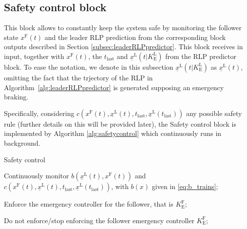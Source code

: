 \documentclass[letterpaper, 10 pt, conference]{ieeeconf}
\theoremstyle{definition}
\theoremstyle{nopoint}
\newcommand{\tildeAdd}{~}
\begin{document}
 
\subsection{Safety control block}
 \label{subsec:safetycontrolblock} 

This block allows to constantly keep the system safe by monitoring the follower state $x^\mathrm{F}(t)$ and the leader RLP prediction from the corresponding block outputs described in Section \ref{subsec:leaderRLPpredictor}. This block receives in input, together with $x^\mathrm{F} (t)$, the $t_\mathrm{last}$ and $\underline{x}^\mathrm{L}(t| K_\mathrm{E}^\mathrm{L})$ from the RLP predictor block. To ease the notation, we denote in this subsection $\underline{x}^\mathrm{L}(t| K_\mathrm{E}^\mathrm{L})$ as $ \underline{x}^\mathrm{L}(t)$, omitting the fact that the trjectory of the RLP in Algorithm\tildeAdd\ref{alg:leaderRLPpredictor} is generated supposing an emergency braking.


Specifically, considering $c(x^\mathrm{F}(t),\underline{x}^\mathrm{L}(t),t_{\mathrm{last}},\underline{x}^\mathrm{L}(t_{\mathrm{last}}))$ any possible safety rule (further details on this will be provided later), the Safety control block is implemented by Algorithm \ref{alg:safetycontrol} which continuously runs in background.

\begin{algorithm}
\caption{Safety control}\label{alg:safetycontrol}
\begin{algorithmic}[1]
\Loop

\State Continuously monitor $b({\underline{x}^\mathrm{L}} (t),{x^\mathrm{F}}(t))$ and $c(x^\mathrm{F}(t),\underline{x}^\mathrm{L}(t),t_{\mathrm{last}},\underline{x}^\mathrm{L}(t_{\mathrm{last}}))$, with $b(x)$ given in \eqref{eq:b_trains};

 
\State Enforce the emergency controller for the follower, that is $K_\mathrm{E}^\mathrm{F}$;

\Else  

Do not enforce/stop enforcing the follower emergency controller $K_\mathrm{E}^\mathrm{F}$;

\EndIf


\EndLoop

\end{algorithmic}
\end{algorithm}
\end{document}

